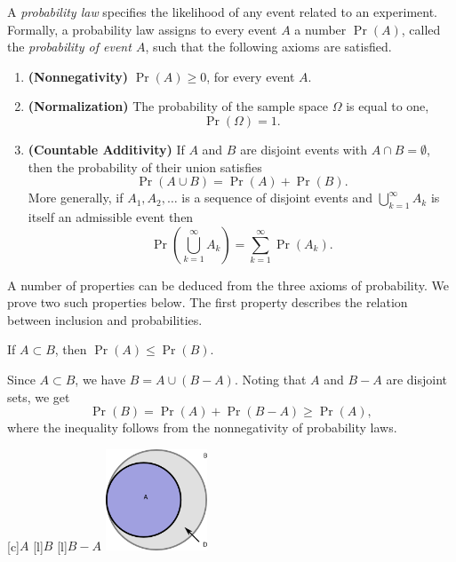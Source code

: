 A \emph{probability law} specifies the likelihood of any event related to an experiment. 
Formally, a probability law assigns to every event $A$ a number $\Pr (A)$, called the \emph{probability of event $A$}, such that the following axioms are satisfied.
\begin{enumerate}
\item \textbf{(Nonnegativity)} $\Pr (A) \geq 0$, for every event $A$.
\item \textbf{(Normalization)} The probability of the sample space $\Omega$ is equal to one,
\begin{equation*}
\Pr (\Omega) = 1 .
\end{equation*}
\item \textbf{(Countable Additivity)} If $A$ and $B$ are disjoint events with $A \cap B = \emptyset$, then the probability of their union satisfies
\begin{equation*}
\Pr (A \cup B) = \Pr (A) + \Pr (B) .
\end{equation*}
More generally, if $A_1, A_2, \ldots$ is a sequence of disjoint events and $\bigcup_{k=1}^{\infty} A_k$ is itself an admissible event then
\begin{equation*}
\Pr \left( \bigcup_{k=1}^{\infty} A_k \right)
= \sum_{k = 1}^{\infty} \Pr (A_k) .
\end{equation*}
\end{enumerate}

A number of properties can be deduced from the three axioms of probability.
We prove two such properties below.
The first property describes the relation between inclusion and probabilities.
\begin{proposition}
If $A \subset B$, then $\Pr (A) \leq \Pr (B)$.
\end{proposition}
Since $A \subset B$, we have $B = A \cup (B - A)$.
Noting that $A$ and $B - A$ are disjoint sets, we get
\begin{equation*}
\Pr (B) = \Pr (A) + \Pr (B - A) \geq \Pr (A) ,
\end{equation*}
where the inequality follows from the nonnegativity of probability laws.

\begin{center}
\begin{psfrags}
[c]{$A$}
[l]{$B$}
[l]{$B - A$}
\includegraphics[height=3.03cm]{Figures/2Chapter/subset}
\end{psfrags}
\end{center}

